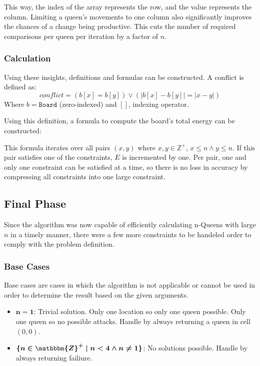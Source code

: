 \documentclass{article}
\begin{document}
This way, the index of the array represents the row, and the value represents the column.
Limiting a queen's movements to one column also significantly improves the chances of a change being productive.
This cuts the number of required comparisons per queen per iteration by a factor of $n$.

\subsubsection{Calculation}
Using these insights, definitions and formulas can be constructed.
A conflict is defined as:
\[
    conflict = (b[x] = b[y]) \lor (|b[x] - b[y]| = |x - y|)
\]
Where $b = \texttt{Board}$ (zero-indexed) and $[ ]$, indexing operator.

Using this definition, a formula to compute the board's total energy can be constructed:


This formula iterates over all pairs $(x, y)$ where $x, y \in \mathbb{Z}^+$, $x \leq n \land y \leq n$.
If this pair satisfies one of the constraints, $E$ is incremented by one.
Per pair, one and only one constraint can be satisfied at a time, so there is no loss in accuracy by compressing all constraints into one large constraint.

\subsection{Final Phase}
Since the algorithm was now capable of efficiently calculating n-Queens with large $n$ in a timely manner,
there were a few more constraints to be handeled order to comply with the problem definition.

\subsubsection{Base Cases}
Base cases are cases in which the algorithm is not applicable or cannot be used in order to determine the result based on the given arguments.

\begin{itemize}
    \item $\boldsymbol{n = 1}$: Trivial solution. Only one location so only one queen possible. Only one queen so no possible attacks.
          Handle by always returning a queen in cell $(0, 0)$.
    \item $\boldsymbol{\{ n \in \mathbbm{Z}^{+} \mid n < 4 \land n \neq 1\}}$: No solutions possible. Handle by always returning failiure.
\end{itemize}
\end{document}
